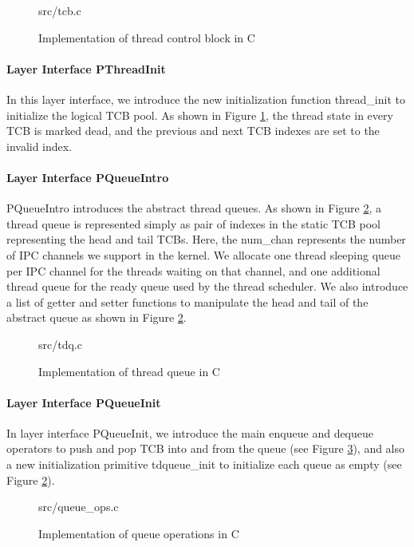 \begin{figure}
	 {src/tcb.c}
	\caption{Implementation of thread control block in C}
	\label{fig:tcb_c}
\end{figure}

\paragraph{Layer Interface PThreadInit}

In this layer interface, we introduce the new initialization function \textsf{thread\_init} to initialize
the logical TCB pool. As shown in Figure \ref{fig:tcb_c}, the thread state in every TCB is marked
dead, and the previous and next TCB indexes are set to the invalid index.

\paragraph{Layer Interface PQueueIntro}

PQueueIntro introduces the abstract thread queues. As shown in Figure \ref{fig:tdq_c}, a thread queue
is represented simply as pair of indexes in the static TCB pool representing the head and tail TCBs.
Here, the \textsf{num\_chan} represents the number of IPC channels we support in the kernel.
We allocate one thread sleeping queue per IPC channel for the threads waiting on that channel,
and one additional thread queue for the ready queue used by the thread scheduler.
We also introduce a list of getter and setter functions to manipulate the head and tail of the abstract
queue as shown in Figure \ref{fig:tdq_c}.

\begin{figure}
	 {src/tdq.c}
	\caption{Implementation of thread queue in C}
	\label{fig:tdq_c}
\end{figure}

\paragraph{Layer Interface PQueueInit}

In layer interface PQueueInit, we introduce the main \textsf{enqueue} and \textsf{dequeue} operators
to push and pop TCB into and from the queue (see Figure \ref{fig:queue_ops_c}), and also a new
initialization primitive \textsf{tdqueue\_init} to initialize each queue as empty (see Figure \ref{fig:tdq_c}).

\begin{figure}
	 {src/queue_ops.c}
	\caption{Implementation of queue operations in C}
	\label{fig:queue_ops_c}
\end{figure}

